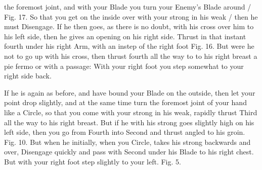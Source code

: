 \newpage


\newpage



the foremost joint, and with your Blade you turn your Enemy's Blade
around / Fig. 17. So that you get on the inside over with your strong
in his weak / then he must Disengage. If he then goes, as there is no
doubt, with his cross over him to his left side, then he gives an
opening on his right side. Thrust in that instant fourth under his
right Arm, with an instep of the right foot Fig. 16. But were he not
to go up with his cross, then thrust fourth all the way to to his
right breast a pie fermo or with a passage: With your right foot you
step somewhat to your right side back.

\exercise{}

If he is again as before, and have bound your Blade on the outside,
then let your point drop slightly, and at the same time turn the
foremost joint of your hand like a Circle, so that you come with your
strong in his weak, rapidly thrust Third all the way to his right
breast. But if he with his strong goes slightly high on his left side,
then you go from Fourth into Second and thrust angled to his
groin. Fig. 10. But when he initially, when you Circle, takes his
strong backwards and over, Disengage quickly and pass with Second
under his Blade to his right chest. But with your right foot step
slightly to your left. Fig. 5.

